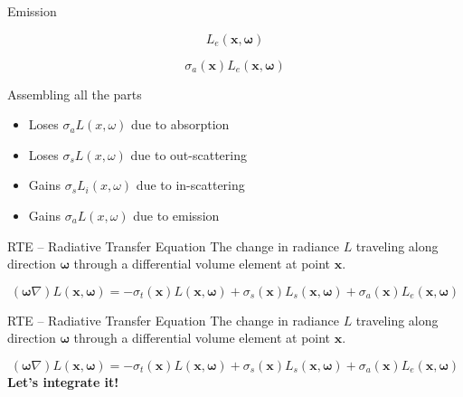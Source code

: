 \documentclass[
  english,            %
  aspectratio=169,    %
]{tumbeamer}
\newcommand\bx[0]{\textbf{x}}
\newcommand\bomega[0]{\boldsymbol{\omega}}
\begin{document}
\begin{frame}{Emission}
\begin{figure}[ht]
    \centering
        
\end{figure}
$$L_e(\bx, \bomega)$$

$$\sigma_a(\boldsymbol{x})L_e(\bx, \bomega)$$
\end{frame}

\begin{frame}{Assembling all the parts}
    \begin{figure}[ht]
        \centering
        
        \label{fig:interactions}
    \end{figure}
    \begin{itemize}
        \item Loses $\sigma_a L(x, \omega)$ due to absorption
        \item Loses $\sigma_s L(x, \omega)$ due to out-scattering
        \item Gains $\sigma_s L_i(x, \omega)$ due to in-scattering
        \item Gains $\sigma_a L(x, \omega)$ due to emission
    \end{itemize}
\end{frame}


\begin{frame}{RTE -- Radiative Transfer Equation}
    The change in radiance $L$ traveling along direction $\boldsymbol{\omega}$
    through a differential volume element at point $\boldsymbol{x}$.
    \begin{figure}[ht]
        \centering
        \scalebox{.7}{
            
        }
    \end{figure}
    \begin{equation} 
        \label{eq:RTE}
        (\bomega \nabla)L(\bx,\bomega) =
        - \sigma_t(\bx)L(\bx,\bomega)
        + \sigma_s(\bx)L_s(\bx,\bomega) + \sigma_a(\bx)L_e(\bx,\bomega)
    \end{equation}
\end{frame}

\begin{frame}{RTE -- Radiative Transfer Equation}
    The change in radiance $L$ traveling along direction $\boldsymbol{\omega}$
    through a differential volume element at point $\boldsymbol{x}$.
    \begin{figure}[ht]
        \centering
        \scalebox{.7}{
            
        }
    \end{figure}
    \begin{equation} 
        \label{eq:RTE}
        (\bomega \nabla)L(\bx,\bomega) =
        - \sigma_t(\bx)L(\bx,\bomega)
        + \sigma_s(\bx)L_s(\bx,\bomega) + \sigma_a(\bx)L_e(\bx,\bomega)
    \end{equation}
    \centering
    \vfill
    \textbf{Let's integrate it!}
\end{frame}
\end{document}
